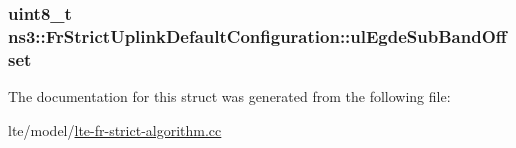 \subsubsection[{\texorpdfstring{ul\+Egde\+Sub\+Band\+Offset}{ulEgdeSubBandOffset}}]{\setlength{\rightskip}{0pt plus 5cm}uint8\+\_\+t ns3\+::\+Fr\+Strict\+Uplink\+Default\+Configuration\+::ul\+Egde\+Sub\+Band\+Offset}\hypertarget{structns3_1_1FrStrictUplinkDefaultConfiguration_aa5d5ed8d729107adeda3b3d0aecfa7e4}{}\label{structns3_1_1FrStrictUplinkDefaultConfiguration_aa5d5ed8d729107adeda3b3d0aecfa7e4}


The documentation for this struct was generated from the following file\+:\begin{DoxyCompactItemize}
\item 
lte/model/\hyperlink{lte-fr-strict-algorithm_8cc}{lte-\/fr-\/strict-\/algorithm.\+cc}\end{DoxyCompactItemize}
